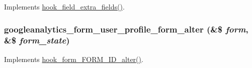 Implements \hyperlink{group__hooks_ga7100332aa5b4d5f6ba72534599d133e5}{hook\_\-field\_\-extra\_\-fields()}. \hypertarget{googleanalytics_8module_ad631ad0346f1f5a589887233c103ac78}{
\subsubsection[{googleanalytics\_\-form\_\-user\_\-profile\_\-form\_\-alter}]{\setlength{\rightskip}{0pt plus 5cm}googleanalytics\_\-form\_\-user\_\-profile\_\-form\_\-alter (\&\$ {\em form}, \/  \&\$ {\em form\_\-state})}}
\label{googleanalytics_8module_ad631ad0346f1f5a589887233c103ac78}
Implements \hyperlink{group__hooks_ga8d4a4089551493d55911bd5c4f218264}{hook\_\-form\_\-FORM\_\-ID\_\-alter()}.

